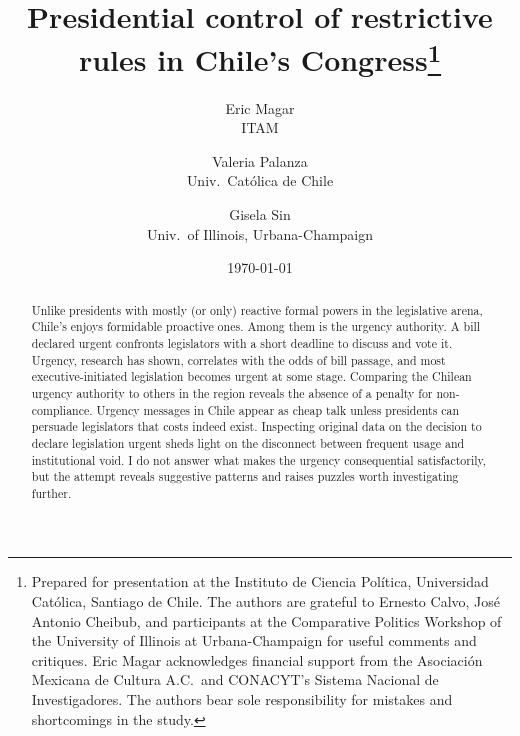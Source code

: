 \documentclass[letter,12pt]{article}
\begin{document}
\title{Presidential control of restrictive rules in Chile's Congress\thanks{Prepared for presentation at the Instituto de Ciencia Pol\'itica, Universidad Cat\'olica, Santiago de Chile. The authors are grateful to Ernesto Calvo, Jos\'e Antonio Cheibub, and participants at the Comparative Politics Workshop of the University of Illinois at Urbana-Champaign for useful comments and critiques. Eric Magar acknowledges financial support from the Asociaci\'on Mexicana de Cultura A.C.\ and CONACYT's Sistema Nacional de Investigadores. The authors bear sole responsibility for mistakes and shortcomings in the study.}}
\author{Eric Magar \\ ITAM \and
        Valeria Palanza \\ Univ.\ Cat\'olica de Chile \and  
        Gisela Sin \\ Univ.\ of Illinois, Urbana-Champaign 
}
\date{\today}
\maketitle


\begin{abstract}
\noindent Unlike presidents with mostly (or only) reactive formal powers in the legislative arena, Chile's enjoys formidable proactive ones. Among them is the urgency authority. A bill declared urgent confronts legislators with a short deadline to discuss and vote it. Urgency, research has shown, correlates with the odds of bill passage, and most executive-initiated legislation becomes urgent at some stage. Comparing the Chilean urgency authority to others in the region reveals the absence of a penalty for non-compliance. Urgency messages in Chile appear as cheap talk unless presidents can persuade legislators that costs indeed exist. Inspecting original data on the decision to declare legislation urgent sheds light on the disconnect between frequent usage and institutional void. I do not answer what makes the urgency consequential satisfactorily, but the attempt reveals suggestive patterns and raises puzzles worth investigating further. 
\end{abstract}

\end{document}
